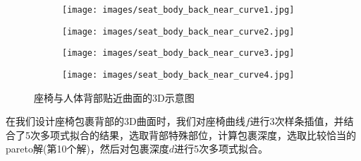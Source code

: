                 \begin{figure}[H]
                    \centering
                    \begin{subfigure}[b]{0.4\textwidth}
                        \texttt{[image: images/seat\_body\_back\_near\_curve1.jpg]}
                    \end{subfigure}
                    \begin{subfigure}[b]{0.4\textwidth}
                        \texttt{[image: images/seat\_body\_back\_near\_curve2.jpg]}
                    \end{subfigure}
                    \begin{subfigure}[b]{0.4\textwidth}
                        \texttt{[image: images/seat\_body\_back\_near\_curve3.jpg]}
                    \end{subfigure}
                    \begin{subfigure}[b]{0.4\textwidth}
                        \texttt{[image: images/seat\_body\_back\_near\_curve4.jpg]}
                    \end{subfigure}
                    \caption{座椅与人体背部贴近曲面的3D示意图}
                    \label{座椅与人体背部贴近曲面的3D示意图}
                \end{figure}

            \par
            在我们设计座椅包裹背部的3D曲面时，我们对座椅曲线$f$进行3次样条插值，并结合了5次多项式拟合的结果，选取背部特殊部位，计算包裹深度，选取比较恰当的pareto解(第10个解)，然后对包裹深度$d$进行5次多项式拟合。
